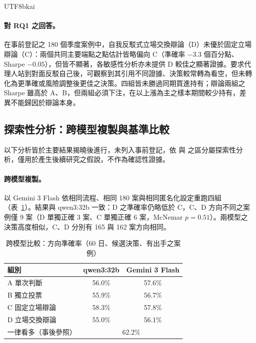 \documentclass[12pt,a4paper]{article}
\newcommand{\grp}[1]{\textsf{#1}}
\begin{document}
\begin{CJK}{UTF8}{bkai}
\paragraph{對 RQ1 之回答。} 在事前登記之 180 個季度案例中，自我反駁式立場交換辯論（\grp{D}）未優於固定立場辯論（\grp{C}）：兩個共同主要端點之點估計皆略偏向 \grp{C}（準確率 $-3.3$ 個百分點、Sharpe $-0.05$），但皆不顯著，各敏感性分析亦未提供 \grp{D} 較佳之顯著證據。要求代理人站到對面反駁自己後，可觀察到其引用不同證據、決策較常轉為看空，但未轉化為更準確或風險調整後更佳之決策。四組皆未勝過同期買進持有；辯論兩組之 Sharpe 雖高於 \grp{A}、\grp{B}，但兩組必須下注，在以上漲為主之樣本期間較少持有，差異不能歸因於辯論本身。

\subsection{探索性分析：跨模型複製與基準比較}
\label{sec:exploratory}

以下分析皆於主要結果揭曉後進行，未列入事前登記，依 \citet{wagenmakers2012agenda} 與 \citet{nosek2018prereg} 之區分屬探索性分析，僅用於產生後續研究之假說，不作為確認性證據。

\paragraph{跨模型複製。} 以 Gemini 3 Flash 依相同流程、相同 180 案與相同匿名化設定重跑四組（表~\ref{tab:flash}）。結果與 qwen3:32b 一致：\grp{D} 之準確率仍略低於 \grp{C}，\grp{C}、\grp{D} 方向不同之案例僅 9 案（\grp{D} 單獨正確 3 案、\grp{C} 單獨正確 6 案，McNemar $p=0.51$）。兩模型之決策高度相似，\grp{C}、\grp{D} 分別有 165 與 162 案方向相同。

\begin{table}[H]
\centering\small
\caption{跨模型比較：方向準確率（60 日、候選決策、有出手之案例）}
\label{tab:flash}
\begin{tabular}{@{}lcc@{}}
\toprule
組別 & qwen3:32b & Gemini 3 Flash \\
\midrule
\grp{A} 單次判斷 & 56.0\% & 57.6\% \\
\grp{B} 獨立投票 & 55.9\% & 56.7\% \\
\grp{C} 固定立場辯論 & 58.3\% & 57.8\% \\
\grp{D} 立場交換辯論 & 55.0\% & 56.1\% \\
\midrule
一律看多（事後參照） & \multicolumn{2}{c}{62.2\%} \\
\bottomrule
\end{tabular}
\end{table}


\end{CJK}
\end{document}
